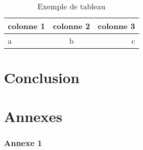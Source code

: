\documentclass[11pt,a4paper]{article}
\begin{document}
\begin{table}[H] %
    \centering
    \begin{tabular}{|l||c|r|}
        \hline %
        colonne 1 & colonne 2 & colonne 3\\
        \hline
        a & b & c\\
        \hline
    \end{tabular}
    \caption{Exemple de tableau}
    \label{tab:exemple}
\end{table}

\begin{rem}
\lipsum[16]
\end{rem}

\begin{theorem}
\lipsum[17]
\end{theorem}

\part*{Conclusion}

\lipsum[11-15]


\listoffigures{}
\listoftables{}

\appendix
\pagebreak
\part*{Annexes}
\section{Annexe 1}
\end{document}
